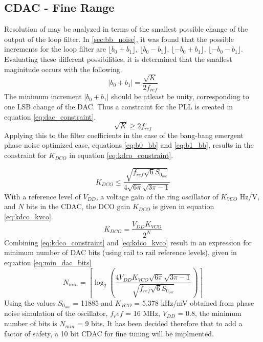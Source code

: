 	\subsection{CDAC - Fine Range}
	Resolution of may be analyzed in terms of the smallest possible change of the output of the loop filter. In \ref{sec:bb_noise}, it was found that the possible increments for the loop filter are $\lfloor b_0+b_1 \rfloor$, $\lfloor b_0-b_1 \rfloor$, $\lfloor -b_0+b_1 \rfloor$, $\lfloor -b_0-b_1 \rfloor$. Evaluating these different possibilities, it is determined that the smallest maginitude occurs with the following.
	\begin{equation}
		|b_0+b_1| = \frac{\sqrt{K}}{2f_{ref}}
	\end{equation}
	The minimum increment $|b_0+b_1|$ should be atleast be unity, corresponding to one LSB change of the DAC. Thus a constraint for the PLL is created in equation \ref{eq:dac_constraint}.
	\begin{equation}\label{eq:dac_constraint}
		\sqrt{K} \geq 2f_{ref}
	\end{equation}
	Applying this to the filter coefficients in the case of the bang-bang emergent phase noise optimized case, equations \ref{eq:b0_bb} and \ref{eq:b1_bb}, results in the constraint for $K_{DCO}$ in equation \ref{eq:kdco_constraint}.

	\begin{equation}\label{eq:kdco_constraint}
		K_{DCO} \leq \frac{\sqrt{f_{ref}\sqrt{6}S_{0_{osc}}}}{4\sqrt{6\pi}\sqrt{3\pi-1}}
	\end{equation}
	With a reference level of $V_{DD}$, a voltage gain of the ring oscillator of $K_{VCO}$ Hz/V, and $N$ bits in the CDAC, the DCO gain $K_{DCO}$ is given in equation \ref{eq:kdco_kvco}.
	\begin{equation}\label{eq:kdco_kvco}
		K_{DCO} = \frac{V_{DD}K_{VCO}}{2^N}
	\end{equation}
	Combining \ref{eq:kdco_constraint} and \ref{eq:kdco_kvco} result in an expression for minimum number of DAC bits (using rail to rail reference levels), given in equation \ref{eq:min_dac_bits}
	\begin{equation}\label{eq:min_dac_bits}
		N_{min} = \left\lceil \log_2\left( \frac{4V_{DD}K_{VCO}\sqrt{6\pi}\sqrt{3\pi-1} }{\sqrt{f_{ref}\sqrt{6}S_{0_{osc}}}} \right)\right\rceil
	\end{equation}
	Using the values $S_{0_{osc}}$ = 11885 and $K_{VCO}$ = 5.378 kHz/mV obtained from phase noise simulation of the oscillator, $f_ref$ = 16 MHz, $V_{DD}$ = 0.8, the minimum number of bits is $N_{min}$ = 9 bits. It has been decided therefore that to add a factor of safety, a 10 bit CDAC for fine tuning will be implmented.


